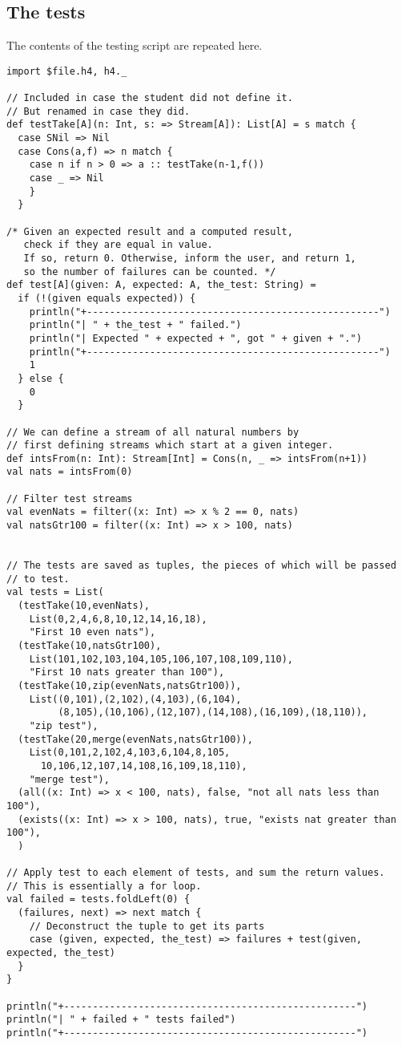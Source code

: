 \documentclass[11pt]{article}
\begin{document}
\subsection*{The tests}
\label{sec:orge03a78e}
The contents of the testing script are repeated here.

\begin{verbatim}
import $file.h4, h4._

// Included in case the student did not define it.
// But renamed in case they did.
def testTake[A](n: Int, s: => Stream[A]): List[A] = s match {
  case SNil => Nil
  case Cons(a,f) => n match {
    case n if n > 0 => a :: testTake(n-1,f())
    case _ => Nil
    }
  }

/* Given an expected result and a computed result,
   check if they are equal in value.
   If so, return 0. Otherwise, inform the user, and return 1,
   so the number of failures can be counted. */
def test[A](given: A, expected: A, the_test: String) =
  if (!(given equals expected)) {
    println("+---------------------------------------------------")
    println("| " + the_test + " failed.")
    println("| Expected " + expected + ", got " + given + ".")
    println("+---------------------------------------------------")
    1
  } else {
    0
  }

// We can define a stream of all natural numbers by
// first defining streams which start at a given integer.
def intsFrom(n: Int): Stream[Int] = Cons(n, _ => intsFrom(n+1))
val nats = intsFrom(0)

// Filter test streams
val evenNats = filter((x: Int) => x % 2 == 0, nats)
val natsGtr100 = filter((x: Int) => x > 100, nats)


// The tests are saved as tuples, the pieces of which will be passed
// to test.
val tests = List(
  (testTake(10,evenNats),
    List(0,2,4,6,8,10,12,14,16,18),
    "First 10 even nats"),
  (testTake(10,natsGtr100),
    List(101,102,103,104,105,106,107,108,109,110),
    "First 10 nats greater than 100"),
  (testTake(10,zip(evenNats,natsGtr100)),
    List((0,101),(2,102),(4,103),(6,104),
         (8,105),(10,106),(12,107),(14,108),(16,109),(18,110)),
    "zip test"),
  (testTake(20,merge(evenNats,natsGtr100)),
    List(0,101,2,102,4,103,6,104,8,105,
      10,106,12,107,14,108,16,109,18,110),
    "merge test"),
  (all((x: Int) => x < 100, nats), false, "not all nats less than 100"),
  (exists((x: Int) => x > 100, nats), true, "exists nat greater than 100"),
  )

// Apply test to each element of tests, and sum the return values.
// This is essentially a for loop.
val failed = tests.foldLeft(0) {
  (failures, next) => next match {
    // Deconstruct the tuple to get its parts
    case (given, expected, the_test) => failures + test(given, expected, the_test)
  }
}

println("+---------------------------------------------------")
println("| " + failed + " tests failed")
println("+---------------------------------------------------")
\end{verbatim}
\end{document}
